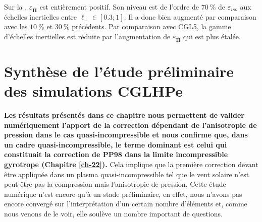 Sur la ,  $\varepsilon_{\overline{\boldsymbol{\Pi}}}$ est entièrement positif. Son niveau est de l'ordre de $\SI{70}{\%}$ de $\varepsilon_{iso}$ aux échelles inertielles entre $\ell_{\perp} \in [\num{0.3};\num{1}]$. Il a donc bien augmenté par comparaison avec les $\SI{10}{\%}$ et $\SI{30}{\%}$ précédents. Par comparaison avec CGL5, la gamme d'échelles inertielles est réduite par l'augmentation de $\varepsilon_{\overline{\boldsymbol{\Pi}}}$ qui est plus étalée. %



\section{Synthèse de l'étude préliminaire des simulations \acs{CGLHPe}}
\label{synth-33}

{\bf Les résultats présentés dans ce chapitre nous permettent de valider numériquement l'apport de la correction dépendant de l'anisotropie de pression dans le cas quasi-incompressible et nous confirme que, dans un cadre quasi-incompressible, le terme dominant est celui qui constituait la correction de \acs{PP98} dans la limite incompressible gyrotrope (Chapitre \ref{ch-22}).} Cela implique que la première correction devant être appliquée dans un plasma quasi-incompressible tel que le vent solaire n'est peut-être pas la compression mais l'anisotropie de pression. Cette étude numérique n'est encore qu'à un stade préliminaire, en effet, nous n'avons pas encore convergé sur l'interprétation d'un certain nombre d'éléments et, comme nous venons de le voir, elle soulève un nombre important de questions.


